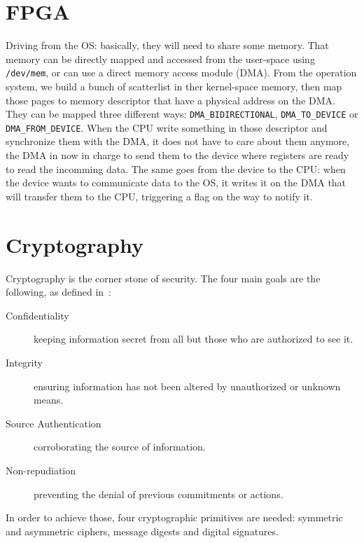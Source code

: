 \section{FPGA}

Driving from the OS: basically, they will need to share some memory.
That memory can be directly mapped and accessed from the user-space using \texttt{/dev/mem}, or can use a direct memory access module (DMA).
From the operation system, we build a bunch of scatterlist in ther kernel-space memory, then map those pages to memory descriptor that have a physical address on the DMA.
They can be mapped three different ways: \texttt{DMA\_BIDIRECTIONAL}, \texttt{DMA\_TO\_DEVICE} or \texttt{DMA\_FROM\_DEVICE}.
When the CPU write something in those descriptor and synchronize them with the DMA, it does not have to care about them anymore, the DMA in now in charge to send them to the device where registers are ready to read the incomming data.
The same goes from the device to the CPU: when the device wants to communicate data to the OS, it writes it on the DMA that will transfer them to the CPU, triggering a flag on the way to notify it.




\section{Cryptography}

Cryptography is the corner stone of security.
The four main goals are the following, as defined in~\cite{Menezes1996}:
\begin{description}
	\item[Confidentiality] keeping information secret from all but those who are authorized to see it.
	\item[Integrity] ensuring information has not been altered by unauthorized or unknown means.
	\item[Source Authentication] corroborating the source of information.
	\item[Non-repudiation] preventing the denial of previous commitments or actions.
\end{description}

In order to achieve those, four cryptographic primitives are needed: symmetric and asymmetric ciphers, message digests and digital signatures.








